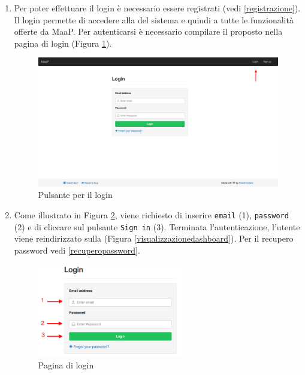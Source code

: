 		\begin{enumerate}
			
			\item Per poter effettuare il login è necessario essere registrati (vedi \ref{registrazione}). \\
			Il login permette di accedere alla  del sistema e quindi a tutte le funzionalità offerte da MaaP. Per autenticarsi è necessario compilare il  proposto nella pagina di login (Figura \ref{fig:loginButton}). 

			\begin{figure}[H]
				\centering \includegraphics[width=1\textwidth]{img/pulsanteLogin.png}
			\caption{ \label{fig:loginButton} Pulsante per il login}
			\end{figure}

			\item Come illustrato in Figura \ref{fig:login}, viene richiesto di inserire \texttt{email} (1), \texttt{password} (2) e di cliccare sul pulsante \texttt{Sign in} (3). Terminata l'autenticazione, l'utente viene reindirizzato sulla  (Figura \ref{visualizzazionedashboard}). Per il recupero password vedi \ref{recuperopassword}.

			\begin{figure}[H]
				\centering \includegraphics[width=0.6\textwidth]{img/login.png}
			\caption{ \label{fig:login} Pagina di login}
			\end{figure}

		\end{enumerate}

